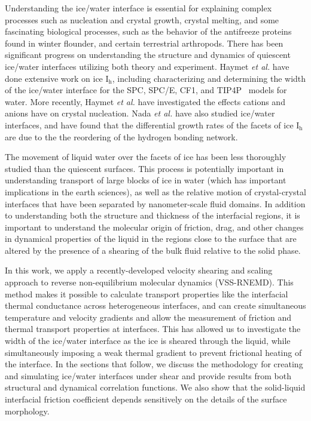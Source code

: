 Understanding the ice/water interface is essential for explaining
complex processes such as nucleation and crystal
growth,\cite{Han92,Granasy95,Vanfleet95} crystal
melting,\cite{Weber83,Han92,Sakai96,Sakai96B} and some fascinating
biological processes, such as the behavior of the antifreeze proteins
found in winter flounder,\cite{Wierzbicki07, Chapsky97} and certain
terrestrial arthropods.\cite{Duman:2001qy,Meister29012013} There has
been significant progress on understanding the structure and dynamics
of quiescent ice/water interfaces utilizing both theory and
experiment.  Haymet \emph{et al.} have done extensive work on ice I$_\mathrm{h}$,
including characterizing and determining the width of the ice/water
interface for the SPC,\cite{Karim90} SPC/E,\cite{Gay02,Bryk02} CF1,\cite{Hayward01,Hayward02} and TIP4P~\cite{Karim88} models for
water.
More recently, Haymet \emph{et al.} have investigated the effects
cations and anions have on crystal
nucleation.\cite{Bryk04,Smith05,Wilson08,Wilson10} Nada \emph{et al.}
have also studied ice/water
interfaces,\cite{Nada95,Nada00,Nada03,Nada12} and have found that the
differential growth rates of the facets of ice I$_\mathrm{h}$ are due to the the
reordering of the hydrogen bonding network.\cite{Nada05}

The movement of liquid water over the facets of ice has been less
thoroughly studied than the quiescent surfaces. This process is
potentially important in understanding transport of large blocks of
ice in water (which has important implications in the earth sciences),
as well as the relative motion of crystal-crystal interfaces that have
been separated by nanometer-scale fluid domains.  In addition to
understanding both the structure and thickness of the interfacial
regions, it is important to understand the molecular origin of
friction, drag, and other changes in dynamical properties of the
liquid in the regions close to the surface that are altered by the
presence of a shearing of the bulk fluid relative to the solid phase.

In this work, we apply a recently-developed velocity shearing and
scaling approach to reverse non-equilibrium molecular dynamics
(VSS-RNEMD). This method makes it possible to calculate transport
properties like the interfacial thermal conductance across
heterogeneous interfaces,\cite{Kuang12} and can create simultaneous
temperature and velocity gradients and allow the measurement of
friction and thermal transport properties at interfaces.  This has
allowed us to investigate the width of the ice/water interface as the
ice is sheared through the liquid, while simultaneously imposing a
weak thermal gradient to prevent frictional heating of the interface.
In the sections that follow, we discuss the methodology for creating
and simulating ice/water interfaces under shear and provide results
from both structural and dynamical correlation functions.  We also
show that the solid-liquid interfacial friction coefficient depends
sensitively on the details of the surface morphology.

